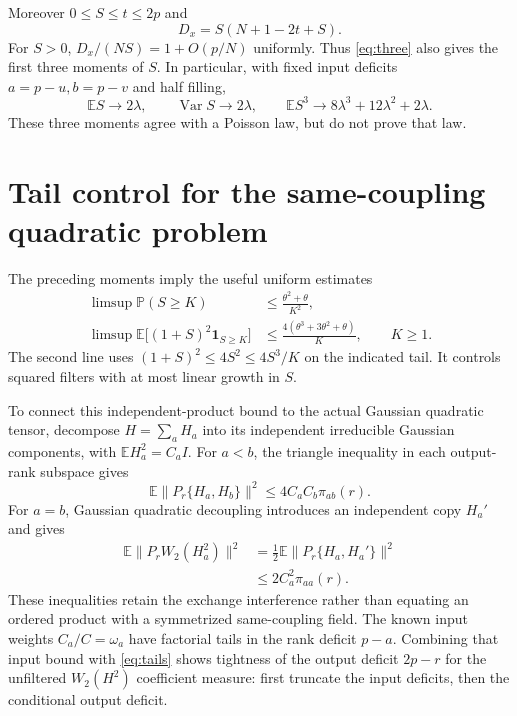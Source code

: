 \documentclass[11pt,a4paper]{article}
\newcommand{\EE}{\mathbb E}
\newcommand{\PP}{\mathbb P}
\begin{document}
Moreover $0\le S\le t\le2p$ and
\begin{equation}
 D_x=S(N+1-2t+S).
\end{equation}
For $S>0$, $D_x/(NS)=1+O(p/N)$ uniformly. Thus \eqref{eq:three}
also gives the first three moments of $S$. In particular, with fixed
input deficits $a=p-u,b=p-v$ and half filling,
\begin{equation}
 \EE S\to2\lambda,\qquad
 \operatorname{Var}S\to2\lambda,\qquad
 \EE S^3\to8\lambda^3+12\lambda^2+2\lambda.
\end{equation}
These three moments agree with a Poisson law, but do not prove that law.

\newpage
\section{Tail control for the same-coupling quadratic problem}
The preceding moments imply the useful uniform estimates
\begin{align}
 \limsup\PP(S\ge K)&\le\frac{\theta^2+\theta}{K^2},\\
 \limsup\EE\big[(1+S)^2\mathbf1_{S\ge K}\big]
 &\le\frac{4(\theta^3+3\theta^2+\theta)}K,
 \qquad K\ge1.
 \label{eq:tails}
\end{align}
The second line uses $(1+S)^2\le4S^2\le4S^3/K$ on the indicated
tail. It controls squared filters with at most linear growth in $S$.

To connect this independent-product bound to the actual Gaussian
quadratic tensor, decompose $H=\sum_a H_a$ into its independent
irreducible Gaussian components, with $\EE H_a^2=C_aI$.
For $a<b$, the triangle inequality in each output-rank subspace gives
\begin{equation}
 \EE\|P_r\{H_a,H_b\}\|^2
       \le4C_aC_b\pi_{ab}(r).
\end{equation}
For $a=b$, Gaussian quadratic decoupling introduces an independent
copy $H_a'$ and gives
\begin{align}
 \EE\|P_rW_2(H_a^2)\|^2
 &=\tfrac12\EE\|P_r\{H_a,H_a'\}\|^2\\
 &\le2C_a^2\pi_{aa}(r).
\end{align}
These inequalities retain the exchange interference rather than
equating an ordered product with a symmetrized same-coupling field.
The known input weights $C_a/C=\omega_a$ have factorial tails in
the rank deficit $p-a$. Combining that input bound with
\eqref{eq:tails} shows tightness of the output deficit $2p-r$ for
the unfiltered $W_2(H^2)$ coefficient measure: first truncate the
input deficits, then the conditional output deficit.
\end{document}
